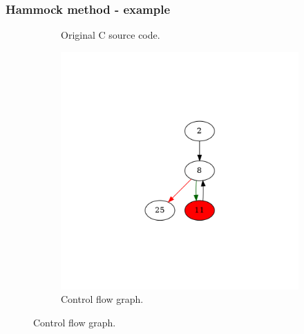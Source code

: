 \documentclass[aspectratio=1610]{beamer}
\begin{document}
\begin{frame}
	\frametitle{Hammock method - example}
	\begin{figure}[htbp]
		\centering
		\begin{subfigure}[b]{0.30\textwidth}
			\centering
			
			\caption{Original C source code.}
		\end{subfigure}
		\begin{subfigure}[b]{0.50\textwidth}
			\centering
			\includegraphics[height=0.6\paperheight]{inc/methods/hammock/example/without-break/main_0002b.png}
			\caption{Control flow graph.}
		\end{subfigure}
	\end{figure}
\end{frame}
\end{document}
